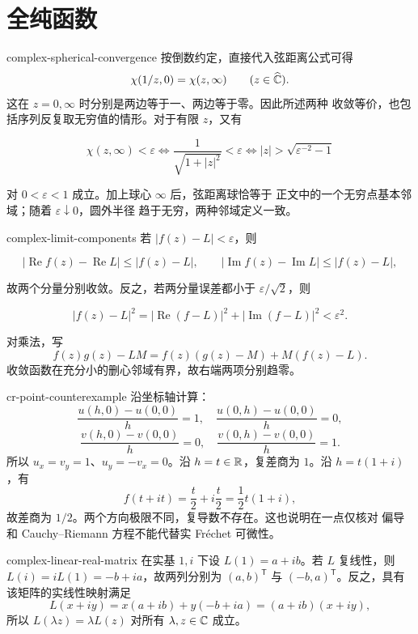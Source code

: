 \chapter{全纯函数}
\label{chap:holomorphic-functions-solutions}

\begin{solution}{complex-spherical-convergence}
按倒数约定，直接代入弦距离公式可得
\[
 \chi(1/z,0)=\chi(z,\infty)\qquad(z\in\widehat{\mathbb{C}}).
\]
这在 \(z=0,\infty\) 时分别是两边等于一、两边等于零。因此所述两种
收敛等价，也包括序列反复取无穷值的情形。对于有限 \(z\)，又有

\[
 \chi(z,\infty)<\varepsilon
 \iff \frac1{\sqrt{1+|z|^2}}<\varepsilon
 \iff |z|>\sqrt{\varepsilon^{-2}-1}
\]

对 \(0<\varepsilon<1\) 成立。加上球心 \(\infty\) 后，弦距离球恰等于
正文中的一个无穷点基本邻域；随着 \(\varepsilon\downarrow0\)，圆外半径
趋于无穷，两种邻域定义一致。
\end{solution}

\begin{solution}{complex-limit-components}
若 \(|f(z)-L|<\varepsilon\)，则

\[
 |\operatorname{Re}f(z)-\operatorname{Re}L|
 \le|f(z)-L|,\qquad
 |\operatorname{Im}f(z)-\operatorname{Im}L|
 \le|f(z)-L|,
\]

故两个分量分别收敛。反之，若两分量误差都小于
\(\varepsilon/\sqrt2\)，则

\[
 |f(z)-L|^2
 =|\operatorname{Re}(f-L)|^2+|\operatorname{Im}(f-L)|^2
 <\varepsilon^2.
\]

对乘法，写
\[
 f(z)g(z)-LM=f(z)(g(z)-M)+M(f(z)-L).
\]
收敛函数在充分小的删心邻域有界，故右端两项分别趋零。
\end{solution}

\begin{solution}{cr-point-counterexample}
沿坐标轴计算：
\[
 \frac{u(h,0)-u(0,0)}h=1,\quad
 \frac{u(0,h)-u(0,0)}h=0,
\]
\[
 \frac{v(h,0)-v(0,0)}h=0,\quad
 \frac{v(0,h)-v(0,0)}h=1.
\]
所以 \(u_x=v_y=1\)、\(u_y=-v_x=0\)。沿 \(h=t\in\mathbb{R}\)，复差商为
\(1\)。沿 \(h=t(1+i)\)，有
\[
 f(t+it)=\frac t2+i\frac t2=\frac12t(1+i),
\]
故差商为 \(1/2\)。两个方向极限不同，复导数不存在。这也说明在一点仅核对
偏导和 Cauchy--Riemann 方程不能代替实 Fréchet 可微性。
\end{solution}

\begin{solution}{complex-linear-real-matrix}
在实基 \(1,i\) 下设 \(L(1)=a+ib\)。若 \(L\) 复线性，则
\(L(i)=iL(1)=-b+ia\)，故两列分别为 \((a,b)^{\mathsf T}\) 与
\((-b,a)^{\mathsf T}\)。反之，具有该矩阵的实线性映射满足
\[
 L(x+iy)=x(a+ib)+y(-b+ia)=(a+ib)(x+iy),
\]
所以 \(L(\lambda z)=\lambda L(z)\) 对所有 \(\lambda,z\in\mathbb{C}\) 成立。
\end{solution}

